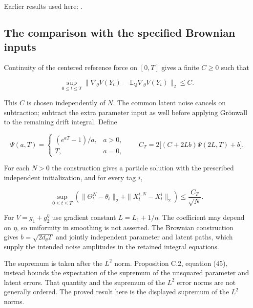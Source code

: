 \documentclass[11pt,a4paper]{report}
\begin{document}
Earlier results used here: \cite[Section~3.1.1]{LangevinLean2026IPLA}.
\subsection{\texorpdfstring{The comparison with the specified Brownian inputs}{The comparison with the specified Brownian inputs}}
\label{report-step-ProximalLangevin-MeanFieldParticles-lean-4}


Continuity of the centered reference force on \([0,T]\) gives a finite \(C\ge0\) such that

\[
\sup_{0\le t\le T}\|
 \nabla_\theta V(Y_t)-\mathbb E_Q\nabla_\theta V(Y_t)\|_2\le C.
\]

This \(C\) is chosen independently of \(N\). The common latent noise cancels on subtraction; subtract the extra parameter input as well before applying Grönwall to the remaining drift integral. Define

\[
\Psi(a,T)=\begin{cases}(e^{aT}-1)/a,&a>0,\\T,&a=0,\end{cases}
\qquad
C_T=2\big[(C+2Lb)\Psi(2L,T)+b\big].
\]

For each \(N>0\) the construction gives a particle solution with the prescribed independent initialization, and for every tag \(i\),

\[
\sup_{0\le t\le T}\left(
 \|\Theta_t^N-\theta_t\|_2+\|X_t^{i,N}-X_t^i\|_2\right)
 \le\frac{C_T}{\sqrt N}.
\]

For \(V=g_1+g_2^\eta\) use gradient constant \(L=L_1+1/\eta\). The coefficient may depend on \(\eta\), so uniformity in smoothing is not asserted. The Brownian construction gives \(b=\sqrt{2d_\theta T}\) and jointly independent parameter and latent paths, which supply the intended noise amplitudes in the retained integral equations.



The supremum is taken after the \(L^2\) norm. Proposition C.2, equation (45), instead bounds the expectation of the supremum of the unsquared parameter and latent errors. That quantity and the supremum of the \(L^2\) error norms are not generally ordered. The proved result here is the displayed supremum of the \(L^2\) norms.
\end{document}
